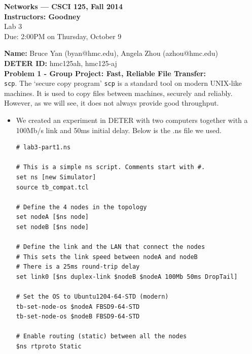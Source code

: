 \documentclass[10pt]{article}
\newcommand{\Problem}[1]{\noindent \textbf{\textbf{Problem #1:  \\ }}}
\newcommand{\Name}[1]{\noindent \textbf{Name:} #1 \\}
\newcommand{\Workedwith}[1]{\noindent \textbf{Worked with:} #1 \\}
\newcommand{\psheader}[2]{
  \begin{center}{\bf Networks --- CSCI 125, Fall 2014 \\
    Instructors: Goodney \\}
    Lab #1 \\
    Due: 2:00PM on #2
    \vspace*{.5cm}
  \end{center}
}
\newcommand{\DeterLabID}[1]{\noindent \textbf{DETER ID:} #1 \\}
\begin{document}
\psheader{3}{Thursday, October 9}


\Name{Bruce Yan (byan@hmc.edu), Angela Zhou (azhou@hmc.edu)}
\DeterLabID{hmc125ah, hmc125-aj}

\Problem{1 - Group Project: Fast, Reliable File Transfer}
\texttt{scp}. The `secure copy program' \texttt{scp} is a standard tool on modern UNIX-like machines. It is used to copy files between machines, securely and reliably. However, as we will see, it does not always provide good throughput.
\begin{itemize}
\itemsep0em
\item We created an experiment in DETER with two computers together with a 100Mb/s link and 50ms initial delay.  Below is the .ns file we used.
\begin{lstlisting}
# lab3-part1.ns

# This is a simple ns script. Comments start with #.
set ns [new Simulator]
source tb_compat.tcl

# Define the 4 nodes in the topology
set nodeA [$ns node]
set nodeB [$ns node]

# Define the link and the LAN that connect the nodes
# This sets the link speed between nodeA and nodeB
# There is a 25ms round-trip delay
set link0 [$ns duplex-link $nodeB $nodeA 100Mb 50ms DropTail]

# Set the OS to Ubuntu1204-64-STD (modern)
tb-set-node-os $nodeA FBSD9-64-STD
tb-set-node-os $nodeB FBSD9-64-STD

# Enable routing (static) between all the nodes
$ns rtproto Static


\end{lstlisting}
\end{itemize}
\end{document}
